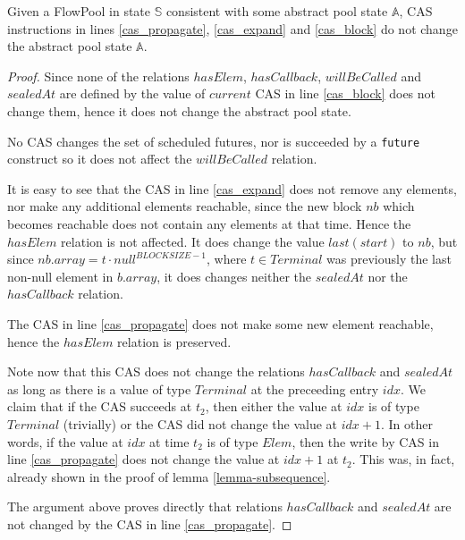 \documentclass[runningheads,a4paper]{llncs}
\begin{document}
\begin{lemma}[Housekeeping]\label{lemma-housekeeping}
Given a FlowPool in state $\mathbb{S}$ consistent with some abstract
pool state $\mathbb{A}$, CAS instructions in lines \ref{cas_propagate}, \ref{cas_expand} and
\ref{cas_block} do not change the abstract pool state $\mathbb{A}$.
\end{lemma}

\begin{proof}
Since none of the relations $hasElem$, $hasCallback$, $willBeCalled$ and $sealedAt$
are defined by the value of $current$ CAS in line \ref{cas_block}
does not change them, hence it does not change the abstract pool
state.

No CAS changes the set of scheduled futures, nor is
succeeded by a \verb=future= construct so it does not affect
the $willBeCalled$ relation.

It is easy to see that the CAS in line \ref{cas_expand} does not remove any elements, nor make
any additional elements reachable, since the new block $nb$ which
becomes reachable does not contain any elements at that time.
Hence the $hasElem$ relation is not affected.
It does change the value $last(start)$ to $nb$, but since $nb.array =
t \cdot null^{BLOCKSIZE - 1}$, where $t \in Terminal$ was previously
the last non-null element in $b.array$, it does changes neither the
$sealedAt$ nor the $hasCallback$ relation.

The CAS in line \ref{cas_propagate} does not make some new element reachable,
hence the $hasElem$ relation is preserved.

Note now that this CAS does not change the relations $hasCallback$
and $sealedAt$ as long as there is a value of type $Terminal$ at the
preceeding entry $idx$.
We claim that if the CAS succeeds at $t_2$, then 
either the value at $idx$ is of type $Terminal$ (trivially) or the CAS
did not change the value at $idx + 1$.
In other words, if the value at $idx$ at time $t_2$ is of type $Elem$,
then the write by CAS in line \ref{cas_propagate} does not change
the value at $idx + 1$ at $t_2$.
This was, in fact, already shown in the proof of lemma \ref{lemma-subsequence}.

The argument above proves directly that relations $hasCallback$
and $sealedAt$ are not changed by the CAS in line \ref{cas_propagate}.
\end{proof}
\end{document}
